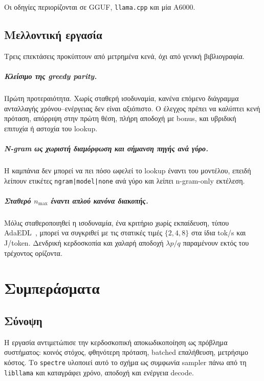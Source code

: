 \documentclass[a4paper,12pt]{report}
\theoremstyle{plain}
\theoremstyle{definition}
\theoremstyle{remark}
\begin{document}
Οι οδηγίες περιορίζονται σε GGUF, \texttt{llama.cpp} και μία A6000.

\section{Μελλοντική εργασία}

Τρεις επεκτάσεις προκύπτουν από μετρημένα κενά, όχι από γενική βιβλιογραφία.

\paragraph{Κλείσιμο της greedy parity.}
Πρώτη προτεραιότητα. Χωρίς σταθερή ισοδυναμία, κανένα επόμενο διάγραμμα
ανταλλαγής χρόνου--ενέργειας δεν είναι αξιόπιστο. Ο έλεγχος πρέπει να καλύπτει
κενή πρόταση, απόρριψη στην πρώτη θέση, πλήρη αποδοχή με bonus, και υβριδική
επιτυχία ή αστοχία του lookup.

\paragraph{N-gram ως χωριστή διαμόρφωση και σήμανση πηγής ανά γύρο.}
Η καμπάνια δεν μπορεί να πει πόσο ωφελεί το lookup έναντι του μοντέλου, επειδή
λείπουν ετικέτες \texttt{ngram|model|none} ανά γύρο και λείπει n-gram-only
εκτέλεση.

\paragraph{Σταθερό \(n_{\max}\) έναντι απλού κανόνα διακοπής.}
Μόλις σταθεροποιηθεί η ισοδυναμία, ένα κριτήριο χωρίς εκπαίδευση, τύπου
AdaEDL~\cite{agrawal2024adaedl}, μπορεί να συγκριθεί με τις στατικές τιμές
\(\{2,4,8\}\) στα ίδια tok/s και J/token. Δενδρική κερδοσκοπία και χαλαρή
αποδοχή \(\lambda p/q\) παραμένουν εκτός του τρέχοντος ορίζοντα.

\chapter{Συμπεράσματα}
\label{ch:conclusions}

\section{Σύνοψη}

Η εργασία αντιμετώπισε την κερδοσκοπική αποκωδικοποίηση ως πρόβλημα
συστήματος: κοινός στόχος, φθηνότερη πρόταση, batched επαλήθευση, μετρήσιμο
κόστος. Το \texttt{spectre} υλοποιεί αυτό το σχήμα ως συμφωνία sampler πάνω
από τη \texttt{libllama} και καταγράφει χρόνο, αποδοχή και ενέργεια decode.
\end{document}
